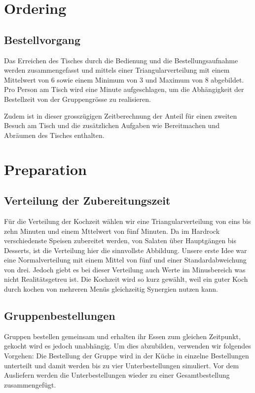 \documentclass[ngerman,a4paper,12pt]{scrreprt}
\begin{document}
	\section{Ordering}			
		\subsection{Bestellvorgang}
			Das Erreichen des Tisches durch die Bedienung und die Bestellungsaufnahme werden zusammengefasst und mittels einer Triangularverteilung mit einem Mittelwert von 6 sowie einem Minimum von 3 und Maximum von 8 abgebildet. Pro Person am Tisch wird eine Minute aufgeschlagen, um die Abhängigkeit der Bestellzeit von der Gruppengrösse zu realisieren.
			
			Zudem ist in dieser grosszügigen Zeitberechnung der Anteil für einen zweiten Besuch am Tisch und die zusätzlichen Aufgaben wie Bereitmachen und Abräumen des Tisches enthalten.
	
	
	\section{Preparation}	
		\subsection{Verteilung der Zubereitungszeit}
			Für die Verteilung der Kochzeit wählen wir eine Triangularverteilung von eins bis zehn Minuten und einem Mttelwert von fünf Minuten. Da im Hardrock verschiedenste Speisen zubereitet werden, von Salaten über Hauptgängen bis Desserts, ist die Verteilung hier die sinnvollste Abbildung. Unsere erste Idee war eine Normalverteilung mit einem Mittel von fünf und einer Standardabweichung von drei. Jedoch giebt es bei dieser Verteilung auch Werte im Minusbereich was nicht Realitätsgetreu ist. Die Kochzeit wird so kurz gewählt, weil ein guter Koch durch kochen von mehreren Menüs gleichzeitig Synergien nutzen kann.
	
	
		\subsection{Gruppenbestellungen}
			Gruppen bestellen gemeinsam und erhalten ihr Essen zum gleichen Zeitpunkt, gekocht wird es jedoch unabhängig. Um dies abzubilden, verwenden wir folgendes Vorgehen: Die Bestellung der Gruppe wird in der Küche in einzelne Bestellungen unterteilt und damit werden bis zu vier Unterbestellungen simuliert. Vor dem Ausliefern werden die Unterbestellungen wieder zu einer Gesamtbestellung zusammengefügt.
			
\end{document}
